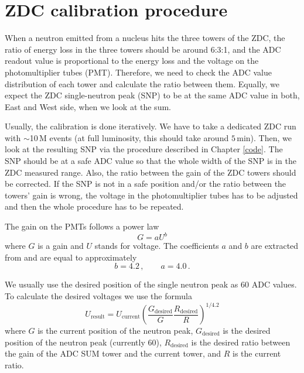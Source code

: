 \section{ZDC calibration procedure}

When a neutron emitted from a nucleus hits the three towers of the ZDC, the ratio of energy loss
in the three towers should be 
around 6:3:1, and the ADC readout value is proportional to the energy loss and the voltage on the
photomultiplier tubes (PMT)\@. Therefore, we need to check the ADC value 
distribution of each tower and calculate the ratio between them. Equally, we expect the ZDC 
single-neutron peak (SNP) to
be at the same ADC value in both, East and West side, when we look at the sum.

Usually, the calibration is done iteratively. We have to take a dedicated ZDC run with
$\sim$10$\,$M events (at full luminosity, this should take around $5\,$min). Then, we
look at the resulting SNP via the procedure described in Chapter \ref{code}.
The SNP should be at a safe ADC value so that the whole width of the SNP is in the ZDC measured
range. Also, the ratio between the gain of the ZDC towers should be corrected. If the
SNP is not in a safe position and/or the ratio between the towers' gain is wrong,
the voltage in the photomultiplier tubes has to be adjusted and then the whole procedure
has to be repeated.

The gain on the PMTs follows a power law
\begin{equation}
 G = aU^b
\end{equation}
where $G$ is a gain and $U$ stands for voltage. The coefficients $a$ and $b$ are 
extracted from \cite{ZDCvoltsDependence}
and are equal to approximately
\begin{equation}
b=4.2\,, \qquad a=4.0\,.
\end{equation}

We usually use the desired position of the single neutron peak as 60 ADC values. To calculate
the desired voltages we use the formula
\begin{equation}
U_{\text{result}} = U_\text{current}\left(\frac{G_\text{desired}}{G} 
\frac{R_\text{desired}}{R}\right)^{1/4.2}
\end{equation}
where $G$ is the current position of the neutron peak, $G_\text{desired}$ is the desired position
of the neutron peak (currently 60), $R_\text{desired}$ is the desired ratio between the gain of the ADC SUM
tower and the current tower, and $R$ is the current ratio.

